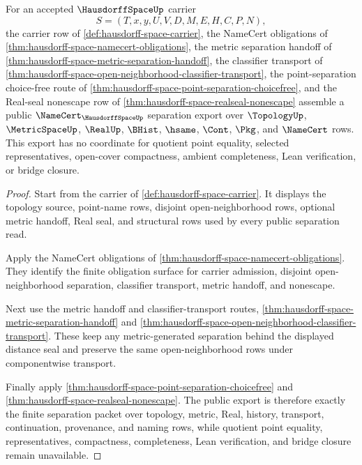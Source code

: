 \begin{theorem}
\label{thm:hausdorff-space-public-separation-export}
For an accepted $\HausdorffSpaceUp$ carrier
$$
S=(T,x,y,U,V,D,M,E,H,C,P,N),
$$
the carrier row of \autoref{def:hausdorff-space-carrier}, the NameCert obligations of \autoref{thm:hausdorff-space-namecert-obligations}, the metric separation handoff of \autoref{thm:hausdorff-space-metric-separation-handoff}, the classifier transport of \autoref{thm:hausdorff-space-open-neighborhood-classifier-transport}, the point-separation choice-free route of \autoref{thm:hausdorff-space-point-separation-choicefree}, and the Real-seal nonescape row of \autoref{thm:hausdorff-space-realseal-nonescape} assemble a public $\NameCert_{\HausdorffSpaceUp}$ separation export over $\TopologyUp$, $\MetricSpaceUp$, $\RealUp$, $\BHist$, $\hsame$, $\Cont$, $\Pkg$, and $\NameCert$ rows. This export has no coordinate for quotient point equality, selected representatives, open-cover compactness, ambient completeness, Lean verification, or bridge closure.
\end{theorem}
\begin{proof}
Start from the carrier of \autoref{def:hausdorff-space-carrier}. It displays the topology source, point-name rows, disjoint open-neighborhood rows, optional metric handoff, Real seal, and structural rows used by every public separation read.

Apply the NameCert obligations of \autoref{thm:hausdorff-space-namecert-obligations}. They identify the finite obligation surface for carrier admission, disjoint open-neighborhood separation, classifier transport, metric handoff, and nonescape.

Next use the metric handoff and classifier-transport routes, \autoref{thm:hausdorff-space-metric-separation-handoff} and \autoref{thm:hausdorff-space-open-neighborhood-classifier-transport}. These keep any metric-generated separation behind the displayed distance seal and preserve the same open-neighborhood rows under componentwise transport.

Finally apply \autoref{thm:hausdorff-space-point-separation-choicefree} and \autoref{thm:hausdorff-space-realseal-nonescape}. The public export is therefore exactly the finite separation packet over topology, metric, Real, history, transport, continuation, provenance, and naming rows, while quotient point equality, representatives, compactness, completeness, Lean verification, and bridge closure remain unavailable.
\end{proof}


